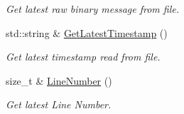 \begin{DoxyCompactItemize}
\begin{DoxyCompactList}\small\item\em Get latest raw binary message from file. \end{DoxyCompactList}\item 
std\+::string \& \hyperlink{class_socket_parser_afed1c5b3b8588dffabf0963b4d499349}{Get\+Latest\+Timestamp} ()
\begin{DoxyCompactList}\small\item\em Get latest timestamp read from file. \end{DoxyCompactList}\item 
\hypertarget{class_socket_parser_ab6c3be35c9e8398fb7da138b63284fb4}{}size\+\_\+t \& \hyperlink{class_socket_parser_ab6c3be35c9e8398fb7da138b63284fb4}{Line\+Number} ()\label{class_socket_parser_ab6c3be35c9e8398fb7da138b63284fb4}

\begin{DoxyCompactList}\small\item\em Get latest Line Number. \end{DoxyCompactList}\end{DoxyCompactItemize}
